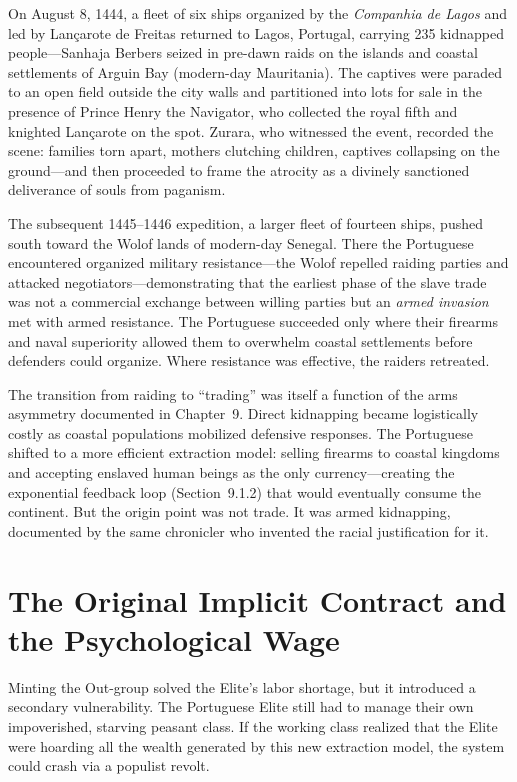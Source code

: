 \documentclass[12pt,openany]{book}
\begin{document}
On August 8, 1444, a fleet of six ships organized by the \textit{Companhia de Lagos} and led by Lançarote de Freitas returned to Lagos, Portugal, carrying 235 kidnapped people---Sanhaja Berbers seized in pre-dawn raids on the islands and coastal settlements of Arguin Bay (modern-day Mauritania). The captives were paraded to an open field outside the city walls and partitioned into lots for sale in the presence of Prince Henry the Navigator, who collected the royal fifth and knighted Lançarote on the spot. Zurara, who witnessed the event, recorded the scene: families torn apart, mothers clutching children, captives collapsing on the ground---and then proceeded to frame the atrocity as a divinely sanctioned deliverance of souls from paganism.

The subsequent 1445--1446 expedition, a larger fleet of fourteen ships, pushed south toward the Wolof lands of modern-day Senegal. There the Portuguese encountered organized military resistance---the Wolof repelled raiding parties and attacked negotiators---demonstrating that the earliest phase of the slave trade was not a commercial exchange between willing parties but an \textit{armed invasion} met with armed resistance. The Portuguese succeeded only where their firearms and naval superiority allowed them to overwhelm coastal settlements before defenders could organize. Where resistance was effective, the raiders retreated.

The transition from raiding to ``trading'' was itself a function of the arms asymmetry documented in Chapter~9. Direct kidnapping became logistically costly as coastal populations mobilized defensive responses. The Portuguese shifted to a more efficient extraction model: selling firearms to coastal kingdoms and accepting enslaved human beings as the only currency---creating the exponential feedback loop (Section~9.1.2) that would eventually consume the continent. But the origin point was not trade. It was armed kidnapping, documented by the same chronicler who invented the racial justification for it.

\section{The Original Implicit Contract and the Psychological Wage}

Minting the Out-group solved the Elite's labor shortage, but it introduced a secondary vulnerability. The Portuguese Elite still had to manage their own impoverished, starving peasant class. If the working class realized that the Elite were hoarding all the wealth generated by this new extraction model, the system could crash via a populist revolt.
\end{document}
